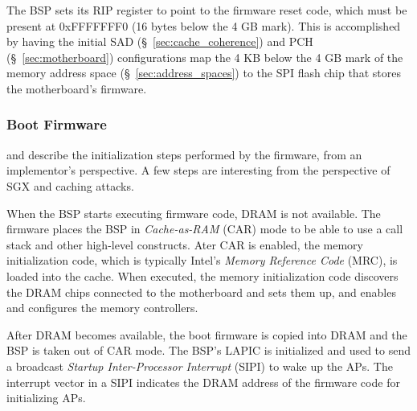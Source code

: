 
The BSP sets its RIP register to point to the firmware reset code, which must
be present at 0xFFFFFFF0 (16 bytes below the 4 GB mark). This is accomplished
by having the initial SAD (\S~\ref{sec:cache_coherence}) and PCH
(\S~\ref{sec:motherboard}) configurations map the 4 KB below the 4 GB mark of
the memory address space (\S~\ref{sec:address_spaces}) to the SPI flash chip
that stores the motherboard's firmware.

\subsubsection{Boot Firmware}

\cite{intel2010booting} and \cite{coreboot2015manual} describe the
initialization steps performed by the firmware, from an implementor's
perspective. A few steps are interesting from the perspective of SGX and
caching attacks.


When the BSP starts executing firmware code, DRAM is not available. The
firmware places the BSP in \textit{Cache-as-RAM} (CAR) mode to be able to use a
call stack and other high-level constructs. Ater CAR is enabled, the memory
initialization code, which is typically Intel's \textit{Memory Reference Code}
(MRC), is loaded into the cache. When executed, the memory initialization code
discovers the DRAM chips connected to the motherboard and sets them up, and
enables and configures the memory controllers.

After DRAM becomes available, the boot firmware is copied into DRAM and the BSP
is taken out of CAR mode. The BSP's LAPIC is initialized and used to send a
broadcast \textit{Startup Inter-Processor Interrupt} (SIPI) to wake up the
APs. The interrupt vector in a SIPI indicates the DRAM address of the firmware
code for initializing APs.



